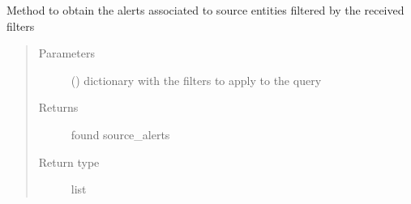 \begin{fulllineitems}
\begin{fulllineitems}
\label{\detokenize{eboa.engine:eboa.engine.query.Query.get_source_alerts}}
Method to obtain the alerts associated to source entities filtered by the received filters
\begin{quote}\begin{description}
\item[{Parameters}] \leavevmode
{} () \textendash{} dictionary with the filters to apply to the query

\item[{Returns}] \leavevmode
found source\_alerts

\item[{Return type}] \leavevmode
list

\end{description}\end{quote}

\end{fulllineitems}



\end{fulllineitems}
